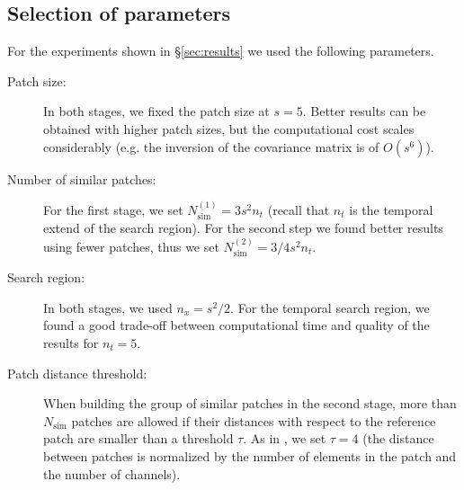 \documentclass{llncs}
\begin{document}
\subsection{Selection of parameters}
\label{sec:parameters}

For the experiments shown in \S \ref{sec:results} we used the following 
parameters.
\begin{description}
	\item[Patch size:] In both stages, we fixed the patch size at $s = 5$. Better 
		results can be obtained with higher patch sizes, but the computational cost
		scales considerably (e.g. the inversion of the covariance matrix is of $O(s^6)$).
	\item[Number of similar patches:] For the first stage, we set
		$N^{(1)}_{\text{sim}} = 3s^2n_t$  (recall that $n_t$ is the temporal
		extend of the search region). For the second step we 
		found better results using fewer patches, thus we set $N^{(2)}_{\text{sim}} = 3/4 s^2n_t$.
	\item[Search region:] In both stages, we used $n_x = s^2/2$.
		For the temporal search region, we found a good trade-off
		between computational time and quality of the results for $n_t = 5$. 
	\item[Patch distance threshold:] When building the group of similar patches
		in the second stage, more than $N_{\text{sim}}$ patches are allowed if their 
		distances with respect to the reference patch are smaller than a threshold $\tau$.
		As in \cite{Lebrun2013ipol}, we set $\tau = 4$ (the distance between patches is normalized by 
		the number of elements in the patch and the number of channels).
\end{description}

%

%
\end{document}
